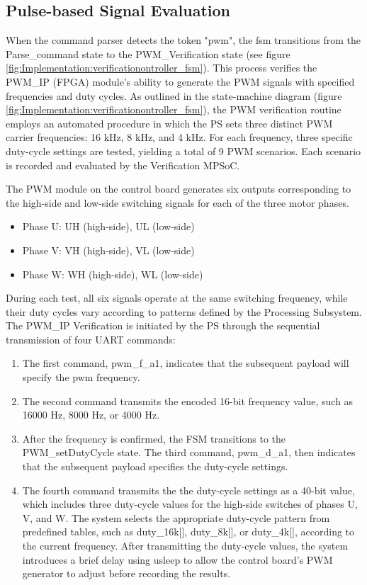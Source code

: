 \subsection{Pulse-based Signal Evaluation}
\label{sec:Implementation:Pulse_Based_Signal_Evaluation}

When the command parser detects the token "pwm", the fsm transitions from the Parse\_command state to the \acs{PWM}\_Verification state (see figure \ref{fig:Implementation:verificationontroller_fsm}). This process verifies the \acs{PWM}\_IP (\acs{FPGA}) module's ability  to generate the \acs{PWM} signals with specified frequencies and duty cycles. As outlined in the state-machine diagram (figure \ref{fig:Implementation:verificationontroller_fsm}), the \acs{PWM} verification routine employs an automated procedure in which the \acs{PS} sets three distinct \acs{PWM} carrier frequencies: 16 kHz, 8 kHz, and 4 kHz. For each frequency, three specific duty-cycle settings are tested, yielding a total of 9 \acs{PWM} scenarios. Each scenario is recorded and evaluated by the Verification \acs{MPSoC}.
 
The \acs{PWM} module on the control board generates six outputs corresponding to the high-side and low-side switching signals for each of the three motor phases.

\begin{itemize}
	\item Phase U: UH (high-side), UL (low-side)
	\item Phase V: VH (high-side), VL (low-side)
	\item Phase W: WH (high-side), WL (low-side)
\end{itemize}

During each test, all six signals operate at the same switching frequency, while their duty cycles vary according to patterns defined by the Processing Subsystem. The \acs{PWM}\_IP Verification is initiated by the \acs{PS} through the sequential transmission of four \acs{UART} commands:

\begin{enumerate}
	\item The first command, pwm\_f\_a1, indicates that the subsequent payload will specify the pwm frequency.
	\item The second command transmits the encoded 16-bit frequency value, such as 16000 Hz, 8000 Hz, or 4000 Hz. 
	\item After the frequency is confirmed, the \acs{FSM} transitions to the \acs{PWM}\_setDutyCycle state. The third command, pwm\_d\_a1, then indicates that the subsequent payload specifies the duty-cycle settings.
	\item The fourth command transmits the the duty-cycle settings as a 40-bit value, which includes three duty-cycle values for the high-side switches of phases U, V, and W. The system selects the appropriate duty-cycle pattern from predefined tables, such as duty\_16k[], duty\_8k[], or duty\_4k[], according to the current frequency. After transmitting the duty-cycle values, the system introduces a brief delay using usleep to allow the control board’s \acs{PWM} generator to adjust before recording the results.
\end{enumerate}

